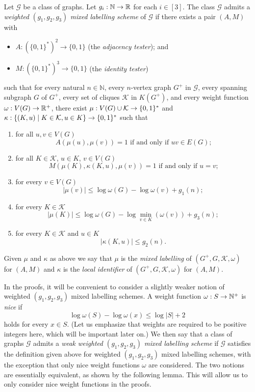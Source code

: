 \documentclass{patmorin}
\renewcommand{\le}{\leqslant}
\renewcommand{\leq}{\leqslant}
\newcommand{\defin}[1]{\emph{\textcolor{brightmaroon}{#1}}}
\newcommand{\NN}{\mathbb{N}}
\DeclarePairedDelimiter{\set}{\{}{\}}
\newcommand{\calG}{\mathcal{G}}
\newcommand{\calK}{\mathcal{K}}
\begin{document}
Let $\calG$ be a class of graphs.
Let $g_i:\NN\to\R$ for each $i\in[3]$. 
The class  $\calG$ admits a \defin{weighted $(g_1,g_2,g_3)$ mixed labelling scheme} of $\calG$ if there exists a pair $(A,M)$ with  
\begin{itemize}[nosep,nolistsep]
     \item $A:(\{0,1\}^*)^2\to\{0,1\}$ (the \defin{adjacency tester}); and
     \item $M:(\{0,1\}^*)^3\to\{0,1\}$ (the \defin{identity tester})
\end{itemize}
such that 
for every natural $n\in\NN$, 
every $n$-vertex graph $G^+$ in $\calG$, 
every spanning subgraph $G$ of $G^+$, 
every set of cliques $\calK$ in $K(G^+)$, and 
every weight function $\omega:V(G)\to \mathbb{R}^+$, 
there exist $\mu: V(G)\cup \calK \to \set{0,1}^*$ and $\kappa:\{(K, u)\mid K\in \calK, u\in K\}\to \set{0,1}^*$ 
such that 
\begin{enumerate}[nosep,nolistsep,label=(\roman*)]
    \item for all $u,v\in V(G)$
    \[
    \textrm{$A(\mu(u),\mu(v))=1$ if and only if $uv\in E(G)$;}
    \]
    \item for all $K\in \calK$, $u\in K$, $v\in V(G)$
    \[
    \textrm{$M(\mu(K),\kappa(K, u),\mu(v))=1$ if and only if $u=v$;}
    \]
    \item for every $v\in V(G)$
    \[
    |\mu(v)| \leq \log \omega(G) - \log\omega(v) + g_1(n);
    \]
    \item for every $K\in \calK$
    \[
    |\mu(K)|\le \log \omega(G) - \log\min_{v\in K}(\omega(v)) + g_3(n);
    \]
    \item  for every $K\in \calK$ and $u\in K$
    \[
    |\kappa(K, u)| \leq g_2(n).
    \]
\end{enumerate} 
Given $\mu$ and $\kappa$  as above 
we say that $\mu$ is the \defin{mixed labelling} of $(G^+,G,\calK,\omega)$ for $(A,M)$ and $\kappa$ is the \defin{local identifier} of $(G^+,G,\calK,\omega)$ for $(A,M)$. 

In the proofs, it will be convenient to consider a slightly weaker notion of weighted $(g_1,g_2,g_3)$ mixed labelling schemes. 
A weight function $\omega:S\to \mathbb{N}^+$ is \defin{nice} if 
\[
\log \omega(S) - \log \omega(x) \leq \log |S| + 2
\]
holds for every $x\in S$. 
(Let us emphasize that weights are required to be positive integers here, which will be important later on.) 
We then say that a class of graphs $\calG$ admits a \defin{weak weighted $(g_1,g_2,g_3)$ mixed labelling scheme} if $\calG$ satisfies the definition given above for weighted $(g_1,g_2,g_3)$ mixed labelling schemes, with the exception that only nice weight functions $\omega$ are considered. 
The two notions are essentially equivalent, as shown by the following lemma. This will allow us to only consider nice weight functions in the proofs. 
\end{document}
